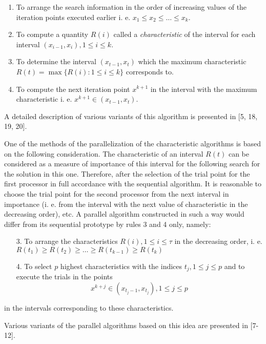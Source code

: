 \documentclass{aip-cp}
\begin{document}
\begin{enumerate}
\item To arrange the search information in the order of increasing values of the iteration points executed earlier i. e. $x_1\leqslant x_2 \leqslant \dots \leqslant x_k$.
\item To compute a quantity $R(i)$ called a \textit{characteristic} of the interval for each interval $(x_{i-1},x_i),1\leqslant i \leqslant k$.
\item To determine the interval $(x_{t-1},x_t)$ which the maximum characteristic $R(t)=\max{\{R(i): 1\leqslant i \leqslant k}\}$ corresponds to.
\item To compute the next iteration point $x^{k+1}$ in the interval with the maximum characteristic i. e. $x^{k+1}\in (x_{t-1},x_t)$.
\end{enumerate}

A detailed description of various variants of this algorithm is presented in [5, 18, 19, 20].

One of the methods of the parallelization of the characteristic algorithms is based on the following consideration. The characteristic of an interval $R(t)$ can be considered as a measure of importance of this interval for the following search for the solution in this one. Therefore, after the selection of the trial point for the first processor in full accordance with the sequential algorithm. It is reasonable to choose the trial point for the second processor from the next interval in importance (i. e. from the interval with the next value of characteristic in the decreasing order), etc. A parallel algorithm constructed in such a way would differ from its sequential prototype by rules 3 and 4 only, namely:
\begin{enumerate}
\item[3.] To arrange the characteristics $R(i),1\leqslant i\leqslant \tau$  in the decreasing order, i. e. $R(t_1)\geqslant R(t_2)\geqslant \dots \geqslant R(t_{k-1}) \geqslant R(t_k)$
\item[4.] To select $p$ highest characteristics with the indices $t_j,1\leqslant j \leqslant p$ and to execute the trials in the points
\begin{displaymath}
x^{k+j} \in (x_{t_j - 1}, x_{t_j}),1\leqslant j \leqslant p
\end{displaymath}
\end{enumerate}

in the intervals corresponding to these characteristics.

Various variants of the parallel algorithms based on this idea are presented in [7-12].
\end{document}
